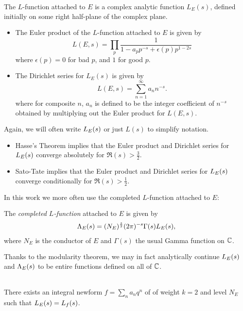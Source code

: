 \begin{definition} \mbox{}

The $L$-function attached to $E$ is a complex analytic function $L_E(s)$, defined initially on some right half-plane of the complex plane.
\begin{itemize}
\item The Euler product of the $L$-function attached to $E$ is given by
\begin{equation}
L(E,s) = \prod_{p} \frac{1}{1 - a_p p^{-s} + \epsilon(p)p^{1-2s}}
\end{equation}
where $\epsilon(p) = 0$ for bad $p$, and $1$ for good $p$.
\item The Dirichlet series for $L_E(s)$ is given by
\begin{equation}
L(E,s) = \sum_{n=1}^{\infty} a_n n^{-s}.
\end{equation}
where for composite $n$, $a_n$ is defined to be the integer coefficient of $n^{-s}$ obtained by multiplying out the Euler product for $L(E,s)$.
\end{itemize}
\end{definition}
Again, we will often write $L_E(s)$ or just $L(s)$ to simplify notation. \\

\begin{corollary} \mbox{}
\begin{itemize}
\item Hasse's Theorem implies that the Euler product and Dirichlet series for $L_E(s)$ converge absolutely for $\Re(s) > \frac{3}{2}$.
\item Sato-Tate implies that the Euler product and Dirichlet series for $L_E(s)$ converge conditionally for $\Re(s) > \frac{1}{2}$.
\end{itemize}
\end{corollary}

In this work we more often use the completed $L$-function attached to $E$:
\begin{definition}
The {\it completed $L$-function} attached to $E$ is given by
\begin{equation}
\Lambda_E(s) = (N_E)^{\frac{s}{2}}(2\pi)^{-s}\Gamma(s)L_E(s),
\end{equation}
where $N_E$ is the conductor of $E$ and $\Gamma(s)$ the usual Gamma function on $\mathbb{C}$.
\end{definition}

Thanks to the modularity theorem, we may in fact analytically continue $L_E(s)$ and $\Lambda_E(s)$ to be entire functions defined on all of $\mathbb{C}$.
\begin{theorem} \mbox{}\\
There exists an integral newform $f = \sum_n a_n q^n$ of of weight $k=2$ and level $N_E$ such that $L_E(s) = L_f(s)$.
\end{theorem}

